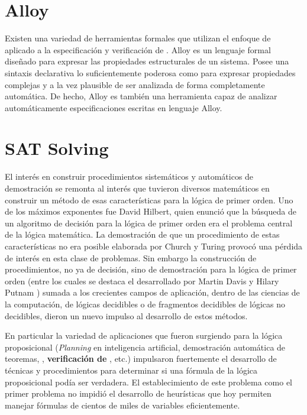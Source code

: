 \section{Alloy}

Existen una variedad de herramientas formales que utilizan el enfoque de \bmc
aplicado a la especificación y verificación de \soft. Alloy
\cite{jackson:acmtosem-11_2} es un lenguaje formal diseñado para expresar las
propiedades estructurales de un sistema. Posee una sintaxis declarativa lo
suficientemente poderosa como para expresar propiedades complejas y a la vez
plausible de ser analizada de forma completamente automática. De hecho, Alloy es
también una herramienta capaz de analizar automáticamente especificaciones
escritas en lenguaje Alloy.



\section{SAT Solving}

El interés en construir procedimientos sistemáticos y automáticos de
demostración se remonta al interés que tuvieron diversos matemáticos en
construir un método de esas características para la lógica de primer orden. Uno
de los máximos exponentes fue David Hilbert, quien enunció que la búsqueda de un
algoritmo de decisión para la lógica de primer orden era el problema central de
la lógica matemática. La demostración de que un procedimiento de estas
características no era posible elaborada por Church y Turing provocó una pérdida
de interés en esta clase de problemas. Sin embargo la construcción de
procedimientos, no ya de decisión, sino de demostración para la lógica de primer
orden (entre los cuales se destaca el desarrollado por Martin Davis y Hilary
Putnam \cite{Davis:1960:CPQ:321033.321034}) sumada a los crecientes campos de
aplicación, dentro de las ciencias de la computación, de lógicas decidibles o de
fragmentos decidibles de lógicas no decidibles, dieron un nuevo impulso al
desarrollo de estos métodos. 

En particular la variedad de aplicaciones que fueron surgiendo para la lógica
proposicional (\emph{Planning} en inteligencia artificial, demostración
automática de teoremas, \textbf{\mc}, \textbf{verificación de \soft}, etc.)
impulsaron fuertemente el desarrollo de técnicas y procedimientos para
determinar si una fórmula de la lógica proposicional podía ser verdadera. El
establecimiento de este problema como el primer problema \npc
\cite{Cook:1971:CTP:800157.805047} no impidió el desarrollo de heurísticas que
hoy permiten manejar fórmulas de cientos de miles de variables eficientemente.

